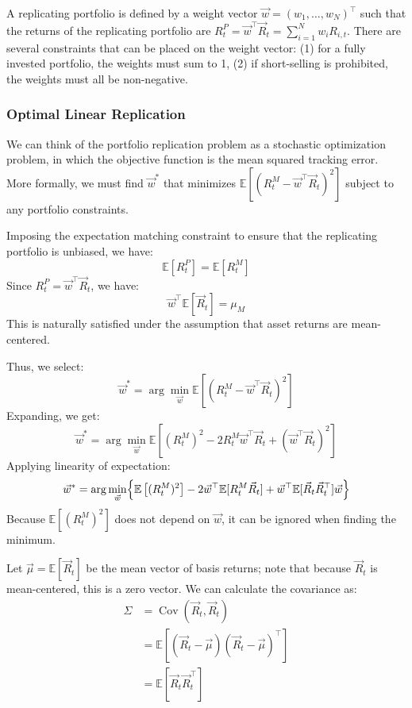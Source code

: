 A replicating portfolio is defined by a weight vector $\vec{w}=(w_1,\dots,w_N)^\top$ such that the returns of the replicating portfolio are $R_t^P=\vec{w}^\top\vec{R}_t=\sum_{i=1}^Nw_iR_{i,t}$. There are several constraints that can be placed on the weight vector: (1) for a fully invested portfolio, the weights must sum to 1, (2) if short-selling is prohibited, the weights must all be non-negative.

\subsubsection{Optimal Linear Replication}

We can think of the portfolio replication problem as a stochastic optimization problem, in which the objective function is the mean squared tracking error. More formally, we must find $\vec{w}^*$ that minimizes $\mathbb{E}\left[\left(R_t^M-\vec{w}^\top\vec{R}_t\right)^2\right]$ subject to any portfolio constraints. 

Imposing the expectation matching constraint to ensure that the replicating portfolio is unbiased, we have: $$\mathbb{E}[R_t^P]=\mathbb{E}[R_t^M]$$ Since $R_t^P=\vec{w}^\top\vec{R}_t$, we have: $$\vec{w}^\top\mathbb{E}[\vec{R}_t]=\mu_M$$ This is naturally satisfied under the assumption that asset returns are mean-centered.

Thus, we select: $$\vec{w}^*=\arg\min_{\vec{w}} \mathbb{E}\left[\left(R_t^M-\vec{w}^\top\vec{R}_t\right)^2\right]$$ Expanding, we get: $$\vec{w}^*=\arg\min_{\vec{w}} \mathbb{E}\left[\left(R_t^M\right)^2-2R_t^M\vec{w}^\top\vec{R}_t +\left(\vec{w}^\top\vec{R}_t\right)^2\right]$$ Applying linearity of expectation: $$\vec{w}^* = \arg\min_{\vec{w}} \Bigl\{ \mathbb{E} \left[ (R_t^M)^2 \right] - 2 \vec{w}^\top \mathbb{E} [R_t^M \vec{R}_t] + \vec{w}^\top \mathbb{E} [\vec{R}_t \vec{R}_t^\top] \vec{w} \Bigr\}$$ Because $\mathbb{E} \left[ (R_t^M)^2 \right]$ does not depend on $\vec{w}$, it can be ignored when finding the minimum.

Let $\vec{\mu}=\mathbb{E}[\vec{R}_t]$ be the mean vector of basis returns; note that because $\vec{R}_t$ is mean-centered, this is a zero vector. We can calculate the covariance as:
\begin{align*}
    \Sigma &= \operatorname{Cov}(\vec{R}_t, \vec{R}_t)\\
    &= \mathbb{E}[(\vec{R}_t-\vec{\mu})(\vec{R}_t-\vec{\mu})^\top]\\
    &= \mathbb{E}[\vec{R}_t\vec{R}_t^\top]
\end{align*}

